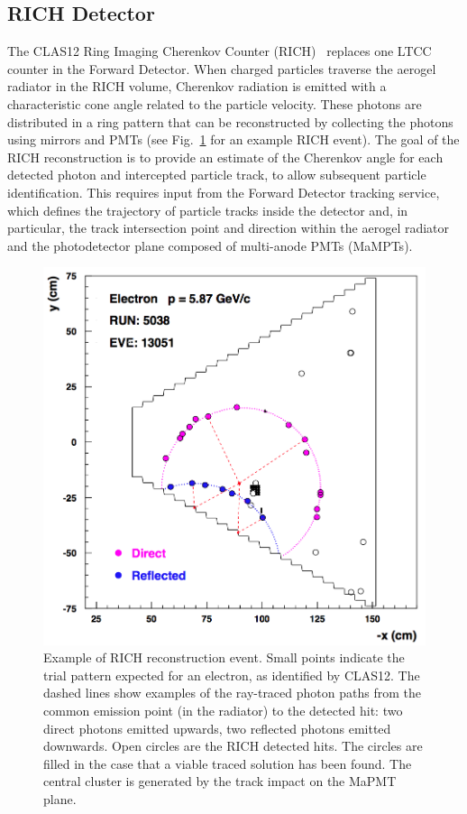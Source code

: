 \subsection{RICH Detector}

The CLAS12 Ring Imaging Cherenkov Counter (RICH)~\cite{rich-nim} replaces one LTCC counter in the Forward
Detector. When charged particles traverse the aerogel radiator in the RICH volume, Cherenkov radiation is
emitted with a characteristic cone angle related to the particle velocity. These photons are distributed in a ring
pattern that can be reconstructed by collecting the photons using mirrors and PMTs (see Fig.~\ref{Fig:RayShow}
for an example RICH event). The goal of the RICH reconstruction is to provide an estimate of the Cherenkov angle
for each detected photon and intercepted particle track, to allow subsequent particle identification. This requires
input from the Forward Detector tracking service, which defines the trajectory of particle tracks inside the detector
and, in particular, the track intersection point and direction within the aerogel radiator and the photodetector plane
composed of multi-anode PMTs (MaMPTs).

\begin{figure}[t]
\begin{center}
\includegraphics[width=0.8\columnwidth]{pics/example.png}
\end{center}
\caption{Example of RICH reconstruction event. Small points indicate the trial pattern expected for an electron,
  as identified by CLAS12. The dashed lines show examples of the ray-traced photon paths from the
  common emission point (in the radiator) to the detected hit: two direct photons emitted upwards, two reflected
  photons emitted downwards. Open circles are the RICH detected hits. The circles are filled in the case that a
  viable traced solution has been found. The central cluster is generated by the track impact on the MaPMT plane.}
\label{Fig:RayShow}
\end{figure}

